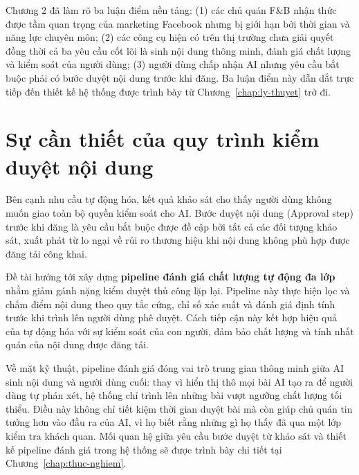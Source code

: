 Chương 2 đã làm rõ ba luận điểm nền tảng: (1) các chủ quán F\&B nhận
thức được tầm quan trọng của marketing Facebook nhưng bị giới hạn bởi
thời gian và năng lực chuyên môn; (2) các công cụ hiện có trên thị
trường chưa giải quyết đồng thời cả ba yêu cầu cốt lõi là sinh nội dung
thông minh, đánh giá chất lượng và kiểm soát của người dùng; (3) người
dùng chấp nhận AI nhưng yêu cầu bắt buộc phải có bước duyệt nội dung
trước khi đăng. Ba luận điểm này dẫn dắt trực tiếp đến thiết kế hệ
thống được trình bày từ Chương~\ref{chap:ly-thuyet} trở đi.

\section{Sự cần thiết của quy trình kiểm duyệt nội dung}\label{sec:approval}

Bên cạnh nhu cầu tự động hóa, kết quả khảo sát cho thấy người dùng không
muốn giao toàn bộ quyền kiểm soát cho AI. Bước duyệt nội dung (Approval
step) trước khi đăng là yêu cầu bắt buộc được đề cập bởi tất cả các đối
tượng khảo sát, xuất phát từ lo ngại về rủi ro thương hiệu khi nội dung
không phù hợp được đăng tải công khai.

Đề tài hướng tới xây dựng \textbf{pipeline đánh giá chất lượng tự động
đa lớp} nhằm giảm gánh nặng kiểm duyệt thủ công lặp lại. Pipeline này
thực hiện lọc và chấm điểm nội dung theo quy tắc cứng, chỉ số xác suất
và đánh giá định tính trước khi trình lên người dùng phê duyệt. Cách tiếp
cận này kết hợp hiệu quả của tự động hóa với sự kiểm soát của con người,
đảm bảo chất lượng và tính nhất quán của nội dung được đăng tải.

Về mặt kỹ thuật, pipeline đánh giá đóng vai trò trung gian thông minh
giữa AI sinh nội dung và người dùng cuối: thay vì hiển thị thô mọi bài
AI tạo ra để người dùng tự phán xét, hệ thống chỉ trình lên những bài
vượt ngưỡng chất lượng tối thiểu. Điều này không chỉ tiết kiệm thời
gian duyệt bài mà còn giúp chủ quán tin tưởng hơn vào đầu ra của AI,
vì họ biết rằng những gì họ thấy đã qua một lớp kiểm tra khách quan.
Mối quan hệ giữa yêu cầu bước duyệt từ khảo sát và thiết kế pipeline
đánh giá trong hệ thống sẽ được trình bày chi tiết tại
Chương~\ref{chap:thuc-nghiem}.
